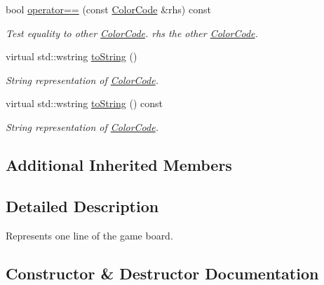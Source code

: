 \begin{DoxyCompactItemize}
bool \hyperlink{classmastermind_1_1logic_1_1_color_code_a2bb0b3f30f7a353348a7b73da5b47e19}{operator==} (const \hyperlink{classmastermind_1_1logic_1_1_color_code}{Color\+Code} \&rhs) const
\begin{DoxyCompactList}\small\item\em Test equality to other \hyperlink{classmastermind_1_1logic_1_1_color_code}{Color\+Code}.  rhs the other \hyperlink{classmastermind_1_1logic_1_1_color_code}{Color\+Code}. \end{DoxyCompactList}\item 
virtual std\+::wstring \hyperlink{classmastermind_1_1logic_1_1_color_code_acba1d8df3a2a5b4907009c7d21cbd723}{to\+String} ()
\begin{DoxyCompactList}\small\item\em String representation of \hyperlink{classmastermind_1_1logic_1_1_color_code}{Color\+Code}. \end{DoxyCompactList}\item 
virtual std\+::wstring \hyperlink{classmastermind_1_1logic_1_1_color_code_a5d3903d505ecbd831d7e3776a0076c51}{to\+String} () const
\begin{DoxyCompactList}\small\item\em String representation of \hyperlink{classmastermind_1_1logic_1_1_color_code}{Color\+Code}. \end{DoxyCompactList}\end{DoxyCompactItemize}
\subsection*{Additional Inherited Members}


\subsection{Detailed Description}
Represents one line of the game board. 

\subsection{Constructor \& Destructor Documentation}
\hypertarget{classmastermind_1_1logic_1_1_color_code_abcbc2b11eac727d545b8a4dcec833054}{}\label{classmastermind_1_1logic_1_1_color_code_abcbc2b11eac727d545b8a4dcec833054} 
